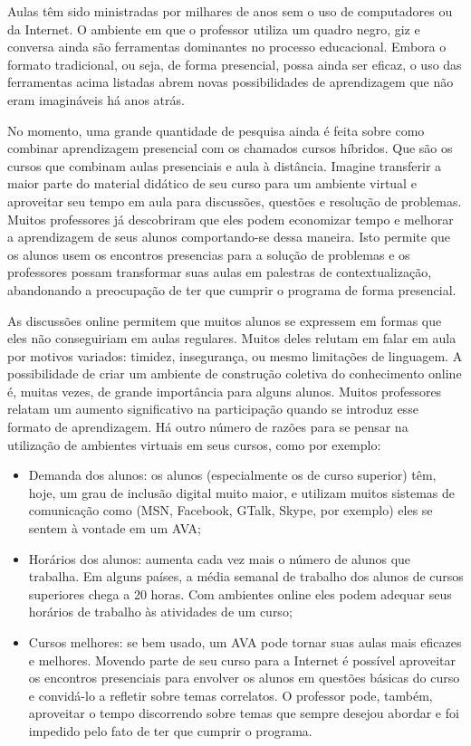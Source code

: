 Aulas têm sido ministradas por milhares de anos sem o uso de computadores ou da Internet. O ambiente em que o professor utiliza um quadro negro, giz e conversa ainda são ferramentas dominantes no processo educacional. Embora o formato tradicional, ou seja, de forma presencial, possa ainda ser eficaz, o uso das ferramentas acima listadas abrem novas possibilidades de aprendizagem que não eram imagináveis há anos atrás.

No momento, uma grande quantidade de pesquisa ainda é feita sobre como combinar aprendizagem presencial com os chamados cursos híbridos. Que são os cursos que combinam aulas presenciais e aula à distância. Imagine transferir a maior parte do material didático de seu curso para um ambiente virtual e aproveitar seu tempo em aula para discussões, questões e resolução de problemas. Muitos professores já descobriram que eles podem economizar tempo e melhorar a aprendizagem de seus alunos comportando-se dessa maneira. Isto permite que os alunos usem os encontros presencias para a solução de problemas e os professores possam transformar suas aulas em palestras de contextualização, abandonando a preocupação de ter que cumprir o programa de forma presencial.

As discussões online permitem que muitos alunos se expressem em formas que eles não conseguiriam em aulas regulares. Muitos deles relutam em falar em aula por motivos variados: timidez, insegurança, ou mesmo limitações de linguagem. A possibilidade de criar um ambiente de construção coletiva do conhecimento online é, muitas vezes, de grande importância para alguns alunos. Muitos professores relatam um aumento significativo na participação quando se introduz esse formato de aprendizagem. Há outro número de razões para se pensar na utilização de ambientes virtuais em seus cursos, como por exemplo:

\begin{itemize}
 \item Demanda dos alunos: os alunos (especialmente os de curso superior) têm, hoje, um grau de inclusão digital muito maior, e utilizam muitos sistemas de comunicação como (MSN, Facebook, GTalk, Skype, por exemplo) eles se sentem à vontade em um AVA;
 \item Horários dos alunos: aumenta cada vez mais o número de alunos que trabalha. Em alguns países, a média semanal de trabalho dos alunos de cursos superiores chega a 20 horas. Com ambientes online eles podem adequar seus horários de trabalho às atividades de um curso;
 \item Cursos melhores: se bem usado, um AVA pode tornar suas aulas mais eficazes e melhores. Movendo parte de seu curso para a Internet é possível aproveitar os encontros presenciais para envolver os alunos em questões básicas do curso e convidá-lo a refletir sobre temas correlatos. O professor pode, também, aproveitar o tempo discorrendo sobre temas que sempre desejou abordar e foi impedido pelo fato de ter que cumprir o programa.
\end{itemize}


